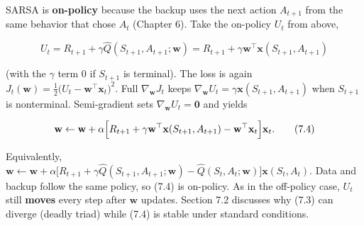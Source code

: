 SARSA is \textbf{on-policy} because the backup uses the next action $A_{t+1}$ from the same behavior that chose $A_t$ (Chapter 6). Take the on-policy $U_t$ from above,

\[
U_t
=
R_{t+1}+\gamma\hat{Q}(S_{t+1},A_{t+1};\mathbf{w})
=
R_{t+1}+\gamma\mathbf{w}^\top\mathbf{x}(S_{t+1},A_{t+1})
\]

(with the $\gamma$ term $0$ if $S_{t+1}$ is terminal). The loss is again $J_t(\mathbf{w})=\tfrac12\bigl(U_t-\mathbf{w}^\top\mathbf{x}_t\bigr)^2$. Full $\nabla_{\mathbf{w}} J_t$ keeps $\nabla_{\mathbf{w}} U_t=\gamma\mathbf{x}(S_{t+1},A_{t+1})$ when $S_{t+1}$ is nonterminal. Semi-gradient sets $\nabla_{\mathbf{w}} U_t=\mathbf{0}$ and yields

\begin{equation}
\mathbf{w}
\leftarrow
\mathbf{w}
+
\alpha
\Bigl[
R_{t+1}
+
\gamma\mathbf{w}^\top\mathbf{x}(S_{t+1},A_{t+1})
-
\mathbf{w}^\top\mathbf{x}_t
\Bigr]
\mathbf{x}_t.
\tag{7.4}
\end{equation}

Equivalently, $\mathbf{w}\leftarrow\mathbf{w}+\alpha\bigl[R_{t+1}+\gamma\hat{Q}(S_{t+1},A_{t+1};\mathbf{w})-\hat{Q}(S_t,A_t;\mathbf{w})\bigr]\mathbf{x}(S_t,A_t)$. Data and backup follow the same policy, so (7.4) is on-policy. As in the off-policy case, $U_t$ still \textbf{moves} every step after $\mathbf{w}$ updates. Section 7.2 discusses why (7.3) can diverge (deadly triad) while (7.4) is stable under standard conditions.

